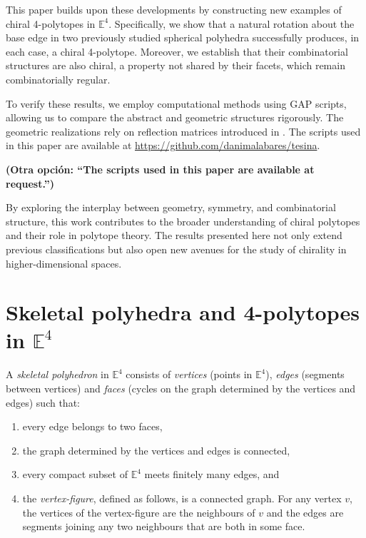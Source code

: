 \documentclass{amsart}
\begin{document}
This paper builds upon these developments by constructing new examples of chiral
4-polytopes in $\mathbb{E}^4$.  Specifically, we show that a natural rotation
about the base edge in two previously studied spherical polyhedra successfully
produces, in each case, a chiral 4-polytope.  Moreover, we establish that their
combinatorial structures are also chiral, a property not shared by their facets,
which remain combinatorially regular.

To verify these results, we employ computational methods using GAP scripts,
allowing us to compare the abstract and geometric structures rigorously. The
geometric realizations rely on reflection matrices introduced in
\cite{petcox}.%
The scripts used in this paper are available at 
\href{https://github.com/danimalabares/tesina}
{https://github.com/danimalabares/tesina}.

{\bf 
(Otra opción: ``The scripts used in this paper are available at request.'')}

By exploring the interplay between geometry, symmetry, and combinatorial
structure, this work contributes to the broader understanding of chiral
polytopes and their role in polytope theory.  The results presented here not
only extend previous classifications but also open new avenues for the study of
chirality in higher-dimensional spaces.
	
\section{Skeletal polyhedra and 4-polytopes in $\mathbb{E}^4$}
\label{section-skeletal-polyhedra-and-4-polytopes-in-E4}

A \textit{skeletal polyhedron} in $\mathbb{E}^4$ consists of \textit{vertices}
(points in $\mathbb{E}^4$), \textit{edges} (segments between vertices) and
\textit{faces} (cycles on the graph determined by the vertices and edges) such
that:
    
\begin{enumerate}
\item every edge belongs to two faces, 

\item the
graph determined by the vertices and edges is connected, 

\item every compact
subset of $\mathbb{E}^4$ meets finitely many edges, and 

\item the
\textit{vertex-figure}, defined as follows, is a connected graph. For any vertex
$v$, the vertices of the vertex-figure are the neighbours of $v$ and the edges
are segments joining any two neighbours that are both in some face.
\end{enumerate}
    
\end{document}
